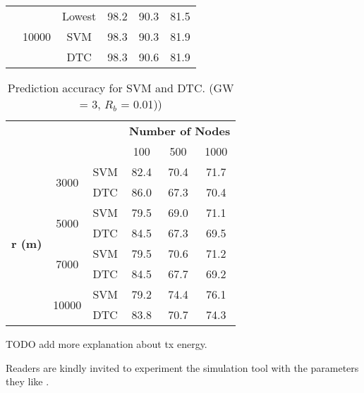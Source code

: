 \begin{table}[h]
\begin{tabular}{|c|c|c|c|c|c|}
                                 & \multirow{3}{*}{10000} & Lowest & 98.2          & 90.3          & 81.5          \\ \cline{3-6}
                                 &                        & SVM    & 98.3          & 90.3          & 81.9          \\ \cline{3-6}
                                 &                        & DTC    & 98.3          & 90.6          & 81.9          \\ \hline
\end{tabular}
\end{table}

\begin{table}[h]
\centering
\caption{Prediction accuracy for SVM and DTC. (GW = 3, ${R_{b}}$ = 0.01))}
\label{table:prediction_accuracy}
\begin{tabular}{|c|c|c|c|c|c|}
\hline
\multicolumn{3}{|c|}{\multirow{2}{*}{}}                        & \multicolumn{3}{c|}{\textbf{Number of Nodes}} \\ \cline{4-6}
\multicolumn{3}{|c|}{}                                         & 100           & 500           & 1000          \\ \hline
\multirow{8}{*}{\textbf{r (m)}} & \multirow{2}{*}{3000}  & SVM & 82.4          & 70.4          & 71.7          \\ \cline{3-6}
                                &                        & DTC & 86.0          & 67.3          & 70.4          \\ \cline{2-6}

                                & \multirow{2}{*}{5000}  & SVM & 79.5          & 69.0          & 71.1          \\ \cline{3-6}
                                &                        & DTC & 84.5          & 67.3          & 69.5          \\ \cline{2-6}

                                & \multirow{2}{*}{7000}  & SVM & 79.5          & 70.6          & 71.2          \\ \cline{3-6}
                                &                        & DTC & 84.5          & 67.7          & 69.2          \\ \cline{2-6}

                                & \multirow{2}{*}{10000} & SVM & 79.2          & 74.4          & 76.1          \\ \cline{3-6}
                                &                        & DTC & 83.8          & 70.7          & 74.3          \\ \hline
\end{tabular}
\end{table}

TODO add more explanation about tx energy.

Readers are kindly invited to experiment the simulation tool with the parameters they like \cite{tugrul_yatagan_2019_2579366}.
